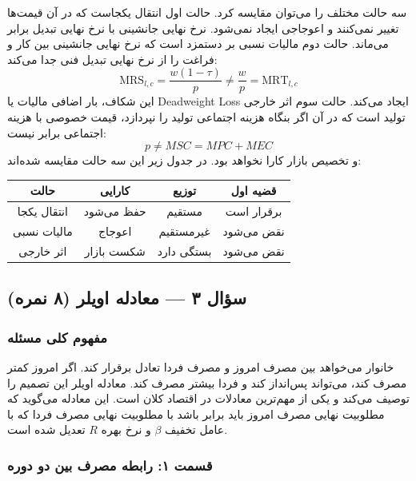 \documentclass[12pt,a4paper]{article}
\newcommand{\MRS}{\mathrm{MRS}}
\newcommand{\MRT}{\mathrm{MRT}}
\begin{document}
سه حالت مختلف را می‌توان مقایسه کرد. حالت اول انتقال یکجاست که در آن قیمت‌ها تغییر نمی‌کنند و اعوجاجی ایجاد نمی‌شود. نرخ نهایی جانشینی با نرخ نهایی تبدیل برابر می‌ماند. حالت دوم مالیات نسبی بر دستمزد است که نرخ نهایی جانشینی بین کار و فراغت را از نرخ نهایی تبدیل فنی جدا می‌کند:
\[
	\MRS_{l,c} = \frac{w(1 - \tau)}{p} \neq \frac{w}{p} = \MRT_{l,c}
\]
این شکاف، بار اضافی مالیات یا Deadweight Loss ایجاد می‌کند. حالت سوم اثر خارجی تولید است که در آن اگر بنگاه هزینه اجتماعی تولید را نپردازد، قیمت خصوصی با هزینه اجتماعی برابر نیست:
\[
	p \neq MSC = MPC + MEC
\]
و تخصیص بازار کارا نخواهد بود. در جدول زیر این سه حالت مقایسه شده‌اند:

\begin{center}
	\begin{tabular}{|c|c|c|c|}
		\hline
		\textbf{حالت} & \textbf{کارایی} & \textbf{توزیع} & \textbf{قضیه اول} \\
		\hline
		انتقال یکجا   & حفظ می‌شود       & مستقیم         & برقرار است        \\
		\hline
		مالیات نسبی   & اعوجاج          & غیرمستقیم      & نقض می‌شود         \\
		\hline
		اثر خارجی     & شکست بازار      & بستگی دارد     & نقض می‌شود         \\
		\hline
	\end{tabular}
\end{center}

\subsection{سؤال ۳ — معادله اویلر (۸ نمره)}

\subsubsection*{مفهوم کلی مسئله}

خانوار می‌خواهد بین مصرف امروز و مصرف فردا تعادل برقرار کند. اگر امروز کمتر مصرف کند، می‌تواند پس‌انداز کند و فردا بیشتر مصرف کند. معادله اویلر این تصمیم را توصیف می‌کند و یکی از مهم‌ترین معادلات در اقتصاد کلان است. این معادله می‌گوید که مطلوبیت نهایی مصرف امروز باید برابر باشد با مطلوبیت نهایی مصرف فردا که با عامل تخفیف $\beta$ و نرخ بهره $R$ تعدیل شده است.

\subsubsection*{قسمت ۱: رابطه مصرف بین دو دوره}
\end{document}
